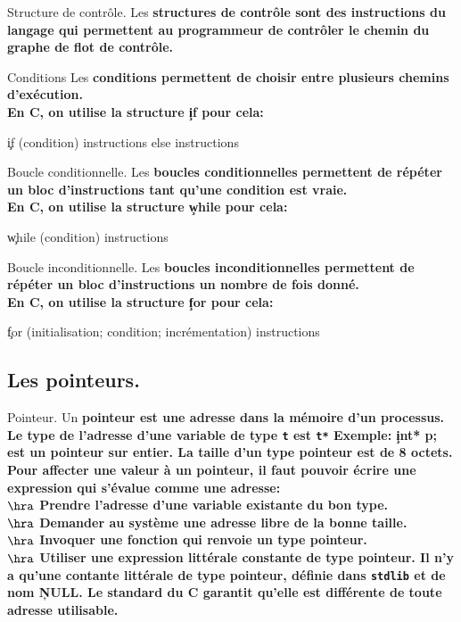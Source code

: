 \documentclass[french, 11pt]{article}
\begin{document}
\begin{defi}{Structure de contrôle.}{}
    Les \bf{structures de contrôle} sont des instructions du langage qui permettent au programmeur de contrôler le chemin du graphe de flot de contrôle.
\end{defi}

\begin{defi}{Conditions}{}
    Les \bf{conditions} permettent de choisir entre plusieurs chemins d'exécution.\\
    En C, on utilise la structure \c{if} pour cela:
    \begin{center}
        \c{if (condition) { instructions } else { instructions }}
    \end{center}
\end{defi}

\begin{defi}{Boucle conditionnelle.}{}
    Les \bf{boucles conditionnelles} permettent de répéter un bloc d'instructions tant qu'une condition est vraie.\\
    En C, on utilise la structure \c{while} pour cela:
    \begin{center}
        \c{while (condition) { instructions }}
    \end{center}
\end{defi}

\begin{defi}{Boucle inconditionnelle.}
    Les \bf{boucles inconditionnelles} permettent de répéter un bloc d'instructions un nombre de fois donné.\\
    En C, on utilise la structure \c{for} pour cela:
    \begin{center}
        \c{for (initialisation; condition; incrémentation) { instructions }}
    \end{center}
\end{defi}

\subsection{Les pointeurs.}

\begin{defi}{Pointeur.}{}
    Un \bf{pointeur} est une adresse dans la mémoire d'un processus.\\
    Le type de l'adresse d'une variable de type \texttt{t} est \texttt{t*}\n
    \bf{Exemple:} \c{int* p;} est un pointeur sur entier.\n
    La taille d'un type pointeur est de 8 octets. Pour affecter une valeur à un pointeur, il faut pouvoir écrire une expression qui s'évalue comme une adresse:\\
    $\hra$ Prendre l'adresse d'une variable existante du bon type.\\
    $\hra$ Demander au système une adresse libre de la bonne taille.\\
    $\hra$ Invoquer une fonction qui renvoie un type pointeur.\\
    $\hra$ Utiliser une expression littérale constante de type pointeur.\n
    Il n'y a qu'une contante littérale de type pointeur, définie dans \texttt{stdlib} et de nom \c{NULL}. Le standard du C garantit qu'elle est différente de toute adresse utilisable.
\end{defi}
\end{document}
